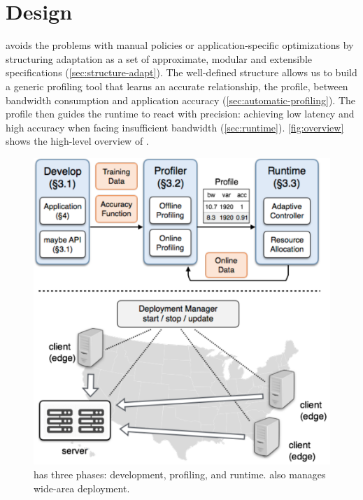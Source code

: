\section{\sysname{} Design}
\label{sec:system}

\sysname{} avoids the problems with manual policies or application-specific
optimizations by structuring adaptation as a set of approximate, modular and
extensible specifications (\autoref{sec:structure-adapt}). The well-defined
structure allows us to build a generic profiling tool that learns an accurate
relationship, the profile, between bandwidth consumption and application
accuracy (\autoref{sec:automatic-profiling}). The profile then guides the
runtime to react with precision: achieving low latency and high accuracy when
facing insufficient bandwidth (\autoref{sec:runtime}). \autoref{fig:overview}
shows the high-level overview of \sysname{}.

\begin{figure}
  \centering
  \includegraphics[width=0.9\linewidth]{figures/system.pdf}
  \vspace{-0.5em}
  \caption{\sysname{} has three phases: development, profiling, and runtime.
    \sysname{} also manages wide-area deployment.}
  \label{fig:overview}
  \vspace{-0.5em}
\end{figure}





